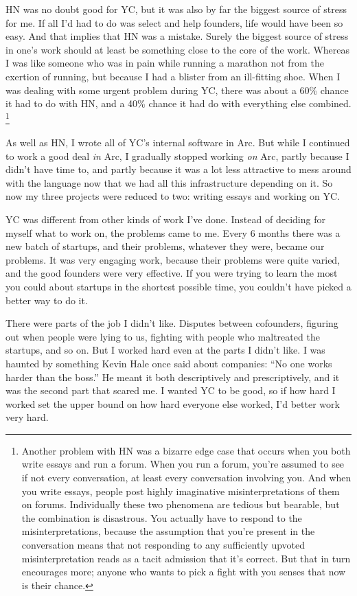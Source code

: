 HN was no doubt good for YC, but it was also by far the biggest source
of stress for me. If all I'd had to do was select and help founders,
life would have been so easy. And that implies that HN was a mistake.
Surely the biggest source of stress in one's work should at least be
something close to the core of the work. Whereas I was like someone who
was in pain while running a marathon not from the exertion of running,
but because I had a blister from an ill-fitting shoe. When I was dealing
with some urgent problem during YC, there was about a 60\% chance it had
to do with HN, and a 40\% chance it had do with everything else
combined. \footnote{Another problem with HN was a bizarre edge case that occurs
when you both write essays and run a forum. When you run a forum, you're
assumed to see if not every conversation, at least every conversation
involving you. And when you write essays, people post highly imaginative
misinterpretations of them on forums. Individually these two phenomena
are tedious but bearable, but the combination is disastrous. You
actually have to respond to the misinterpretations, because the
assumption that you're present in the conversation means that not
responding to any sufficiently upvoted misinterpretation reads as a
tacit admission that it's correct. But that in turn encourages more;
anyone who wants to pick a fight with you senses that now is their
chance.}

As well as HN, I wrote all of YC's internal software in Arc. But while I
continued to work a good deal \emph{in} Arc, I gradually stopped working
\emph{on} Arc, partly because I didn't have time to, and partly because
it was a lot less attractive to mess around with the language now that
we had all this infrastructure depending on it. So now my three projects
were reduced to two: writing essays and working on YC.

YC was different from other kinds of work I've done. Instead of deciding
for myself what to work on, the problems came to me. Every 6 months
there was a new batch of startups, and their problems, whatever they
were, became our problems. It was very engaging work, because their
problems were quite varied, and the good founders were very effective.
If you were trying to learn the most you could about startups in the
shortest possible time, you couldn't have picked a better way to do it.

There were parts of the job I didn't like. Disputes between cofounders,
figuring out when people were lying to us, fighting with people who
maltreated the startups, and so on. But I worked hard even at the parts
I didn't like. I was haunted by something Kevin Hale once said about
companies: ``No one works harder than the boss.'' He meant it both
descriptively and prescriptively, and it was the second part that scared
me. I wanted YC to be good, so if how hard I worked set the upper bound
on how hard everyone else worked, I'd better work very hard.

